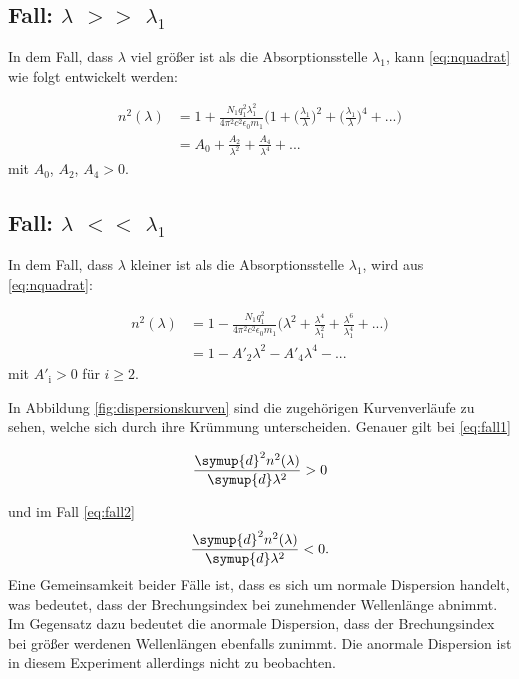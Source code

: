 \subsection{Fall: \texorpdfstring{$\lambda$}{Lambda} $>>$ \texorpdfstring{$\lambda_1$}{Lambda_1}}
In dem Fall, dass $\lambda$ viel größer ist als die Absorptionsstelle $\lambda_1$, kann \ref{eq:nquadrat} wie folgt entwickelt werden:

\begin{equation}
\begin{aligned}
n^2(\lambda) &= 1 + \frac{N_1 q_1^2 \lambda_1^2}{4 \pi^2 c^2 \epsilon_0 m_1} \biggl(1 + \biggl(\frac{\lambda_1}{\lambda}\biggr)^2 + \biggl(\frac{\lambda_1}{\lambda}\biggr)^4 + ... \biggr) \\
             &= A_0 + \frac{A_2}{\lambda^2} + \frac{A_4}{\lambda^4} + ...
\label{eq:fall1}
\end{aligned}
\end{equation}
mit $A_0$, $A_2$, $A_4 > 0$.




\subsection{Fall: \texorpdfstring{$\lambda$}{Lambda} $<<$ \texorpdfstring{$\lambda_1$}{Lambda_1}}
In dem Fall, dass $\lambda$ kleiner ist als die Absorptionsstelle $\lambda_1$, wird aus \ref{eq:nquadrat}:

\begin{equation}
\begin{aligned}
n^2(\lambda) &= 1 - \frac{N_1 q_1^2}{4 \pi^2 c^2 \epsilon_0 m_1} \biggl(\lambda^2 + \frac{\lambda^4}{\lambda_1^2} + \frac{\lambda^6}{\lambda_1^4} + ... \biggr) \\
             &= 1 - A'_2 \lambda^2 - A'_4 \lambda^4 - ...
\label{eq:fall2}
\end{aligned}
\end{equation}
mit $A'_{\text{i}} > 0$ für $i \geq 2$.

In Abbildung \ref{fig:dispersionskurven} sind die zugehörigen Kurvenverläufe zu sehen, welche sich durch ihre Krümmung unterscheiden. Genauer gilt bei \ref{eq:fall1}

\begin{equation}
\frac{\symup{d}^2 n^2 (\lambda)}{\symup{d} \lambda^2} > 0
\end{equation}

und im Fall \ref{eq:fall2}
\begin{equation}
\frac{\symup{d}^2n^2(\lambda)}{\symup{d}\lambda^2} < 0.
\end{equation}
Eine Gemeinsamkeit beider Fälle ist, dass es sich um normale Dispersion handelt, was bedeutet, dass der Brechungsindex bei zunehmender Wellenlänge abnimmt. Im Gegensatz dazu bedeutet die anormale Dispersion,
dass der Brechungsindex bei größer werdenen Wellenlängen ebenfalls zunimmt. Die anormale Dispersion ist in diesem Experiment allerdings nicht zu beobachten.

